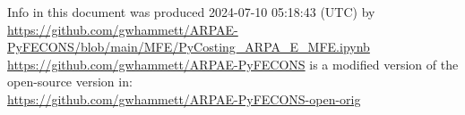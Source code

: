 {\footnotesize
\noindent
Info in this document was produced 2024-07-10 05:18:43 (UTC) by\\
\url{https://github.com/gwhammett/ARPAE-PyFECONS/blob/main/MFE/PyCosting_ARPA_E_MFE.ipynb}\\
\url{https://github.com/gwhammett/ARPAE-PyFECONS}
is a modified version of the open-source version in:\\
\url{https://github.com/gwhammett/ARPAE-PyFECONS-open-orig}
} %

